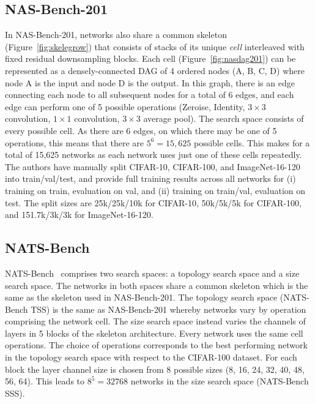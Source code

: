 \documentclass{article}
\begin{document}
\subsection{NAS-Bench-201}
\label{sec:nasbench201}


In NAS-Bench-201, networks also share a common skeleton (Figure~\ref{fig:skelegrow}) that consists of stacks of its unique {\it cell} interleaved with fixed residual downsampling blocks. Each cell (Figure~\ref{fig:nasdag201}) can be represented as a densely-connected DAG of 4 ordered nodes (A, B, C, D) where node A is the input and node D is the output. In this graph, there is an edge connecting each node to all subsequent nodes for a total of 6 edges, and each edge can perform one of 5 possible operations (Zeroise, Identity, $3\times 3$ convolution, $1\times 1$ convolution, $3\times 3$ average pool). The search space consists of every possible cell. As there are 6 edges, on which there may be one of 5 operations, this means that there are $5^6 = 15,625$ possible cells. This makes for a total of 15,625 networks as each network uses just one of these cells repeatedly. The authors have manually split CIFAR-10, CIFAR-100, and ImageNet-16-120~\citep{chrabaszcz2017downsampled} into train/val/test, and provide full training results across all networks for (i) training on train, evaluation on val, and (ii) training on train/val, evaluation on test. The split sizes are 25k/25k/10k for CIFAR-10, 50k/5k/5k for CIFAR-100, and 151.7k/3k/3k for ImageNet-16-120.

\subsection{NATS-Bench}
\label{sec:natsbench}
NATS-Bench~\citep{dong2021nats} comprises two search spaces: a topology search space and a size search space. The networks in both spaces share a common skeleton which is the same as the skeleton used in NAS-Bench-201. The topology search space (NATS-Bench TSS) is the same as NAS-Bench-201 whereby networks vary by operation comprising the network cell. 
The size search space instead varies the channels of layers in 5 blocks of the skeleton architecture. Every network uses the same cell operations. The choice of operations corresponds to the best performing network in the topology search space with respect to the CIFAR-100 dataset. For each block the layer channel size is chosen from 8 possible sizes (8, 16, 24, 32, 40, 48, 56, 64). This leads to $8^5 = 32768$ networks in the size search space (NATS-Bench SSS).
\end{document}
